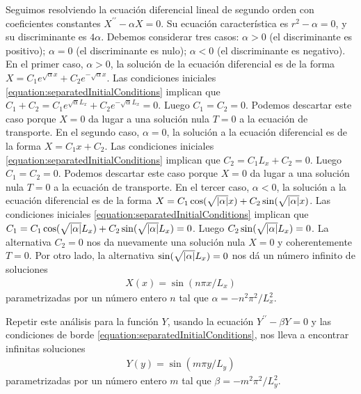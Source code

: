 \documentclass{article}
\DeclarePairedDelimiter\abs{\lvert}{\rvert}%
\begin{document}
    Seguimos resolviendo la ecuación diferencial lineal de segundo orden con coeficientes constantes \(X^{\prime\prime} - \alpha X = 0\).
    Su ecuación característica es \(r^2 - \alpha = 0\), y su discriminante es \(4 \alpha\).
    Debemos considerar tres casos: \(\alpha > 0\) (el discriminante es positivo); \(\alpha = 0\) (el discriminante es nulo); \(\alpha < 0\) (el discriminante es negativo).
    En el primer caso, \(\alpha > 0\), la solución de la ecuación diferencial es de la forma \(X = C_1 e^{\sqrt{\alpha} x} + C_2 e^{- \sqrt{\alpha} x}\).
    Las condiciones iniciales \eqref{equation:separatedInitialConditions} implican que \(C_1 + C_2 = C_1 e^{\sqrt{\alpha} L_x} + C_2 e^{- \sqrt{\alpha} L_x} = 0\).
    Luego \(C_1 = C_2 = 0\).
    Podemos descartar este caso porque \(X = 0\) da lugar a una solución nula \(T = 0\) a la ecuación de transporte.
    En el segundo caso, \(\alpha = 0\), la solución a la ecuación diferencial es de la forma \(X = C_1 x + C_2\).
    Las condiciones iniciales \eqref{equation:separatedInitialConditions} implican que \(C_2 = C_1 L_x + C_2 = 0\).
    Luego \(C_1 = C_2 = 0\).
    Podemos descartar este caso porque \(X = 0\) da lugar a una solución nula \(T = 0\) a la ecuación de transporte.
    En el tercer caso, \(\alpha < 0\), la solución a la ecuación diferencial es de la forma \(X = C_1 \cos(\sqrt{\abs{\alpha}} x) + C_2 \sin(\sqrt{\abs{\alpha}} x)\).
    Las condiciones iniciales \eqref{equation:separatedInitialConditions} implican que \(C_1 = C_1 \cos(\sqrt{\abs{\alpha}} L_x) + C_2 \sin(\sqrt{\abs{\alpha}} L_x) = 0\).
    Luego \(C_2 \sin(\sqrt{\abs{\alpha}} L_x) = 0\).
    La alternativa \(C_2 = 0\) nos da nuevamente una solución nula \(X = 0\) y coherentemente \(T = 0\).
    Por otro lado, la alternativa \(\sin(\sqrt{\abs{\alpha}} L_x) = 0\) nos dá un número infinito de soluciones
    \begin{align}
      X(x) = \sin(n \pi x / L_x)
    \end{align}
    parametrizadas por un número entero \(n\) tal que \(\alpha = - n^2 \pi^2 / L_x^2\).

    Repetir este análisis para la función \(Y\), usando la ecuación \(Y^{\prime\prime} - \beta Y = 0\) y las condiciones de borde \eqref{equation:separatedInitialConditions}, nos lleva a encontrar infinitas soluciones
    \begin{align}
      Y(y) = \sin(m \pi y / L_y)
    \end{align}
    parametrizadas por un número entero \(m\) tal que \(\beta = - m^2 \pi^2 / L_y^2\).
\end{document}
